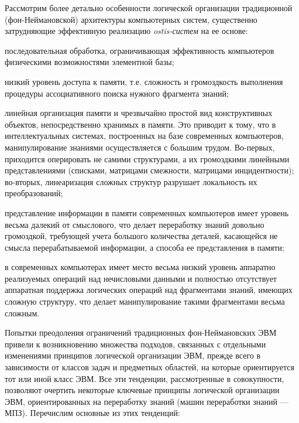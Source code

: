 Рассмотрим более детально особенности логической организации традиционной (фон-Неймановской) архитектуры компьютерных систем, существенно затрудняющие эффективную реализацию \textit{ostis-систем} на ее основе:
\begin{textitemize}
	\item последовательная обработка, ограничивающая эффективность компьютеров физическими возможностями элементной базы;
	\item низкий уровень доступа к памяти, т.е. сложность и громоздкость выполнения процедуры ассоциативного поиска нужного фрагмента знаний; 
	\item линейная организация памяти и чрезвычайно простой вид конструктивных объектов, непосредственно хранимых в памяти. Это приводит к тому, что в интеллектуальных системах, построенных на базе современных компьютеров, манипулирование знаниями осуществляется с большим трудом. Во-первых, приходится оперировать не самими структурами, а их громоздкими линейными представлениями (списками, матрицами смежности, матрицами инцидентности); во-вторых, линеаризация сложных структур разрушает локальность их преобразований;
	\item представление информации в памяти современных компьютеров имеет уровень весьма далекий от смыслового, что делает переработку знаний довольно громоздкой, требующей учета большого количества деталей, касающейся не смысла перерабатываемой информации, а способа ее представления в памяти;
	\item в современных компьютерах имеет место весьма низкий уровень аппаратно реализуемых операций над нечисловыми данными и полностью отсутствует аппаратная поддержка логических операций над фрагментами знаний, имеющих сложную структуру, что делает манипулирование такими фрагментами весьма сложным.
\end{textitemize}

Попытки преодоления ограничений традиционных фон-Неймановских ЭВМ привели к возникновению множества подходов, связанных с отдельными изменениями принципов логической организации ЭВМ, прежде всего в зависимости от классов задач и предметных областей, на которые ориентируется тот или иной класс ЭВМ. Все эти тенденции, рассмотренные в совокупности, позволяют очертить некоторые ключевые принципы логической организации ЭВМ, ориентированных на переработку знаний (машин переработки знаний --- МПЗ). Перечислим основные из этих тенденций:


